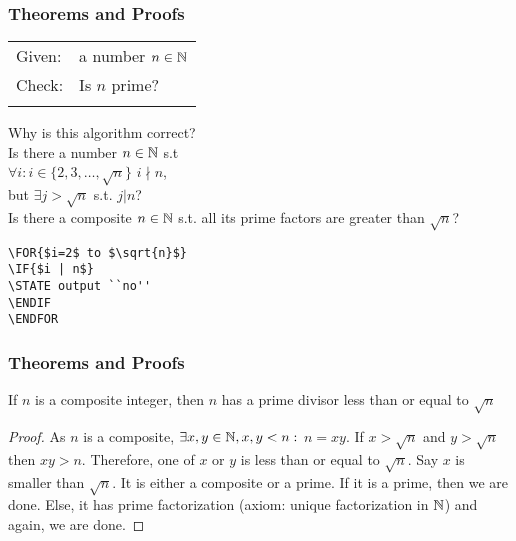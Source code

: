  \begin{frame}[fragile]
\frametitle{Theorems and Proofs}

\begin{tabular}{ll}
Given: & a number $n \in {{\mathbb{N}}}$\\
Check: & Is $n$ prime?\\
& \\
\end{tabular}

Why is this algorithm correct?\\

Is there a number $n \in {{\mathbb{N}}}$ s.t \\
$\forall i: i \in \{2,3,\ldots, \sqrt{n}\}$ $i \nmid n$,\\
but $\exists j > \sqrt{n}$ s.t. $j | n$?\\
\vspace{0.1in}
Is there a composite $n \in {{\mathbb{N}}}$ s.t. all its prime factors are greater than $\sqrt{n}$?\\
\vspace{0.1in}
%
\begin{lstlisting}
\FOR{$i=2$ to $\sqrt{n}$}
\IF{$i | n$}
\STATE output ``no''
\ENDIF
\ENDFOR
\end{lstlisting}

\end{frame}
 \begin{frame}[fragile]
\frametitle{Theorems and Proofs}

\begin{theorem}
If $n$ is a composite integer, then $n$ has a prime divisor less than or equal to $\sqrt{n}$
\end{theorem}
\begin{proof}
As $n$ is a composite, $\exists x,y \in {{\mathbb{N}}}, x,y < n:$ $n =xy$. If $x > \sqrt{n}$ and $y > \sqrt{n}$ then
$xy > n$. Therefore, one of $x$ or $y$ is less than or equal to $\sqrt{n}$. Say $x$ is smaller than $\sqrt{n}$. It is either a composite or a prime. If it is a prime, then we are done. Else, it has prime factorization (axiom: unique factorization in ${{\mathbb{N}}}$) and again, we are done.
\end{proof}
\end{frame}


